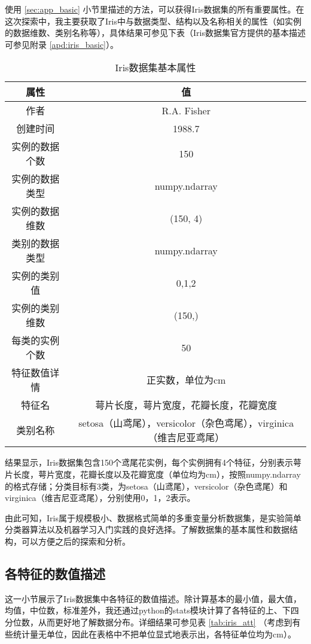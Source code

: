 \documentclass[12pt,a4paper]{article}
\theoremstyle{definition}
\begin{document}
使用 \ref{sec:app_basic} 小节里描述的方法，可以获得Iris数据集的所有重要属性。在这次探索中，我主要获取了Iris中与数据类型、结构以及名称相关的属性（如实例的数据维数、类别名称等），具体结果可参见下表（Iris数据集官方提供的基本描述可参见附录 \ref{apd:iris_basic}）。

\begin{table}[H]
	\renewcommand\arraystretch{1.35}
	\caption{Iris数据集基本属性}
	\label{tab:iris_basic}
	\centering
	
	\begin{tabular}{c|c}
		\centering
		属性 & 值 \\
		\hline
		作者 & R.A. Fisher \\
		创建时间 & 1988.7 \\
		实例的数据个数 & 150 \\
		实例的数据类型 & numpy.ndarray \\
		实例的数据维数 & (150, 4) \\
		类别的数据类型 & numpy.ndarray \\
		实例的类别值 & 0,1,2 \\
		实例的类别维数 & (150,) \\
		每类的实例个数 & 50 \\
		特征数值详情 & 正实数，单位为cm \\
		特征名 & 萼片长度，萼片宽度，花瓣长度，花瓣宽度 \\
		类别名称 & setosa（山鸢尾），versicolor（杂色鸢尾），virginica（维吉尼亚鸢尾） \\
	\end{tabular}
\end{table}

结果显示，Iris数据集包含150个鸢尾花实例，每个实例拥有4个特征，分别表示萼片长度，萼片宽度，花瓣长度以及花瓣宽度（单位均为cm），按照numpy.ndarray的格式存储；分类目标有3类，为setosa（山鸢尾），versicolor（杂色鸢尾）和virginica（维吉尼亚鸢尾），分别使用0，1，2表示。

由此可知，Iris属于规模极小、数据格式简单的多重变量分析数据集，是实验简单分类器算法以及机器学习入门实践的良好选择。了解数据集的基本属性和数据结构，可以方便之后的探索和分析。

\subsection{各特征的数值描述}

这一小节展示了Iris数据集中各特征的数值描述。除计算基本的最小值，最大值，均值，中位数，标准差外，我还通过python的stats模块计算了各特征的上、下四分位数，从而更好地了解数据分布。详细结果可参见表 \ref{tab:iris_att} （考虑到有些统计量无单位，因此在表格中不把单位显式地表示出，各特征单位均为cm）。
\end{document}
